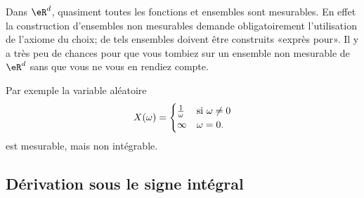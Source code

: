 \begin{remark}
    Dans \( \eR^d\), quasiment toutes les fonctions et ensembles sont mesurables. En effet la construction d'ensembles non mesurables demande obligatoirement l'utilisation de l'axiome du choix; de tels ensembles doivent être construits «exprès pour». Il y a très peu de chances pour que vous tombiez sur un ensemble non mesurable de \( \eR^d\) sans que vous ne vous en rendiez compte.

    Par exemple la variable aléatoire 
    \begin{equation}
        X(\omega)=\begin{cases}
            \frac{1}{ \omega }    &   \text{si $ \omega\neq 0$}\\
            \infty    &    \text{$\omega=0$}.
        \end{cases}
    \end{equation}
    est mesurable, mais non intégrable.
\end{remark}

\subsection{Dérivation sous le signe intégral}

